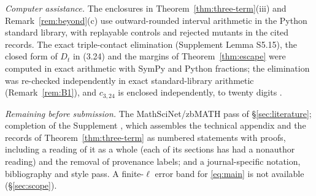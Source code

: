 \emph{Computer assistance.} The enclosures in Theorem~\ref{thm:three-term}(iii) and Remark~\ref{rem:beyond}(c) use outward-rounded interval arithmetic in the Python standard library, with replayable controls and rejected mutants in the cited records. The exact triple-contact elimination (Supplement Lemma S5.15), the closed form of $D_t$ in (3.24) and the margins of Theorem~\ref{thm:escape} were computed in exact arithmetic with SymPy and Python fractions; the elimination was re-checked independently in exact standard-library arithmetic (Remark~\ref{rem:B1}), and $c_{3,24}$ is enclosed independently, to twenty digits .

\emph{Remaining before submission.} The MathSciNet/zbMATH pass of \S\ref{sec:literature}; completion of the Supplement , which assembles the technical appendix and the records of Theorem~\ref{thm:three-term} as numbered statements with proofs, including a reading of it as a whole (each of its sections has had a nonauthor reading) and the removal of provenance labels; and a journal-specific notation, bibliography and style pass. A finite-$\ell$ error band for \eqref{eq:main} is not available (\S\ref{sec:scope}).
